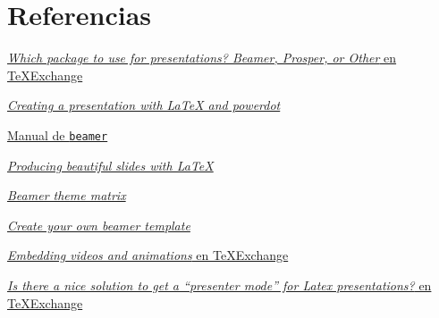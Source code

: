 \section{Referencias}

\href{https://tex.stackexchange.com/questions/16204/which-package-to-use-for-presentations-beamer-prosper-or-other}{\emph{Which
package to use for presentations? Beamer, Prosper, or Other} en
TeXExchange}

\href{http://www.dmi.me.uk/blog/2010/11/08/creating-a-presentation-with-latex-and-powerdot/}{\emph{Creating
a presentation with LaTeX and powerdot}}

\href{http://osl.ugr.es/CTAN/macros/latex/contrib/beamer/doc/beameruserguide.pdf}{Manual
de \lstinline!beamer!}

\href{https://tug.org/pracjourn/2005-2/miller/miller.pdf}{\emph{Producing
beautiful slides with LaTeX}}

\href{https://hartwork.org/beamer-theme-matrix/}{\emph{Beamer theme matrix}}


\href{https://www.r-bloggers.com/create-your-own-beamer-template/}{\emph{Create
your own beamer template}}

\href{https://tex.stackexchange.com/questions/1574/embedding-videos-and-animations}{\emph{Embedding
videos and animations} en TeXExchange}

\href{https://tex.stackexchange.com/questions/21777/is-there-a-nice-solution-to-get-a-presenter-mode-for-latex-presentations}{\emph{Is
there a nice solution to get a ``presenter mode'' for Latex
presentations?} en TeXExchange}
